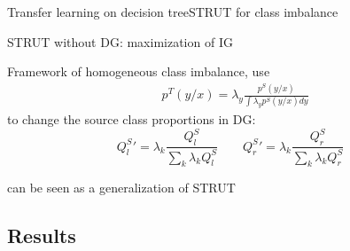 \begin{frame}{Transfer learning on decision tree}{STRUT for class imbalance}

    \begin{tcolorbox}[title=\strutnd,size=title,boxrule=0.2pt]
    STRUT without DG: maximization of IG
    \end{tcolorbox}
    \pause
    \begin{tcolorbox}[title=\struthi,size=title,boxrule=0.2pt]
    Framework of homogeneous class imbalance, use
    \begin{align*}
        & p^T(y/x) = \lambda_y \frac{p^S(y/x)}{\int{\lambda_y p^S(y/x)dy}} \tag{2}
    \end{align*}
    to change the source class proportions in DG:
    \begin{equation*}
    {Q_l^S} ' = \lambda_k\frac{ Q_l^S}{\sum \limits_{k}{ \lambda_{k}Q_l^S}} \quad \quad
    {Q_r^S} ' = \lambda_k\frac{ Q_r^S}{\sum \limits_{k}{ \lambda_{k}Q_r^S}} 
    \label{probcond}
    \end{equation*}
    \end{tcolorbox}
    \pause
    \centering \textcolor{myorange}{\struthi} can be seen as a generalization of STRUT
 
\end{frame}

\subsection{Results}

